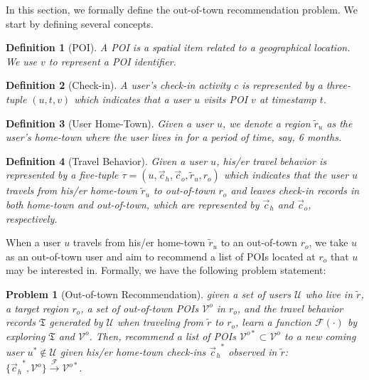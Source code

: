 \documentclass[letterpaper]{article} %
\newtheorem{defn}{Definition}
\newtheorem{prbl}{Problem}
\begin{document}
In this section, we formally define the out-of-town recommendation problem. 
We start by defining several concepts.

\begin{defn}[POI]
A POI is a spatial item related to a geographical location.
We use $v$ to represent a POI identifier.
\end{defn}

\begin{defn}[Check-in]
A user's check-in activity $c$ is represented by a three-tuple $ (u, t, v) $ which indicates that a user $u$ visits POI $v$ at timestamp $t$.
\end{defn}

\begin{defn}[User Home-Town]
Given a user $u$, we denote a region $ \tilde{r}_u $ as the user's home-town where the user lives in for a period of time, say, 6 months.
\end{defn}

\begin{defn}[Travel Behavior]
Given a user $u$, his/er travel behavior is represented by a five-tuple $ \tau = (u, \vec{c}_{h}, \vec{c}_{ o}, \tilde{r}_u, r_o ) $ which indicates that the user $u$ travels from his/er home-town $ \tilde{r}_u $ to out-of-town $ r_o $ and leaves check-in records in both home-town and out-of-town, which are represented by $ \vec{c}_{ h} $ and $ \vec{c}_{ o} $, respectively. 
\end{defn}


When a user $u$ travels from his/er home-town  $ \tilde{r}_u $ to an out-of-town $ r_o $, we take $u$ as an out-of-town user and aim to recommend a list of POIs located at $ r_o $ that $u$ may be interested in.
%
Formally, we have the following problem statement: 

\begin{prbl}[Out-of-town Recommendation]
given a set of users $\mathcal{U}$ who live in $\tilde{r}$, 
a target region $ r_o $, 
a set of out-of-town POIs $\mathcal{V}^o$ in $r_o$, 
and the travel behavior records $ \mathfrak{T} $ generated by $ \mathcal{U} $ when traveling from $\tilde{r}$ to $r_o$,
% 
learn a function $ \mathcal{F}( \cdot ) $ by exploring $ \mathfrak{T} $ and $ \mathcal{V}^o $.
Then, recommend a list of POIs $\mathcal{V}^{o{\ast}} \subset \mathcal{V}^o $ to a new coming user $ u^{\ast} \notin \mathcal{U} $ given his/er home-town check-ins $ {\vec{c}_h}^{\ast} $ observed in  $\tilde{r}$: 
$ \{ {\vec{c}_h}^{\ast}, \mathcal{V}^o \} \xrightarrow{ \mathcal{F} } \mathcal{V}^{o{\ast}}  $.
\end{prbl}
\end{document}
